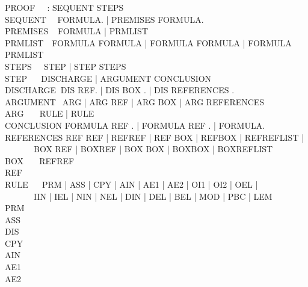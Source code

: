\documentclass[BA.tex]{subfiles}
\begin{document}
\newcommand{\id}{{\bf id}}
{\ttfamily
\noindent
PROOF $~~~~~$\tra \id: SEQUENT STEPS\\
SEQUENT $~~~$\tra {} FORMULA. | 
                   PREMISES FORMULA.\\
PREMISES $~~$\tra {} FORMULA
                |  PRMLIST\\
PRMLIST $~~~$\tra FORMULA  FORMULA
                | FORMULA FORMULA 
                | FORMULA\txt{, } PRMLIST\\
STEPS $~~~~~$\tra STEP | STEP STEPS\\
STEP $~~~~~~$\tra DISCHARGE | ARGUMENT CONCLUSION\\
DISCHARGE $~$\tra DIS REF. | DIS BOX . | DIS REFERENCES .\\
ARGUMENT $~~$\tra ARG | ARG REF | ARG BOX | ARG REFERENCES\\
ARG $~~~~~~~$\tra RULE  | RULE\\
CONCLUSION   \tra FORMULA REF . |  FORMULA REF . 
                |  FORMULA.\\
REFERENCES   \tra REF REF | REFREF |
                  REF BOX | REFBOX |
                  REF\txt{, }REFLIST |\\
$~~~~~~~~~~~~~~$  BOX REF | BOXREF |
                  BOX BOX | BOXBOX |
                  BOX\txt{, }REFLIST\\
BOX $~~~~~~~$\tra REF\txt{-}REF\\
REF $~~~~~~~$\tra [\id]\\
RULE $~~~~~~$\tra PRM | ASS | CPY | AIN | AE1 | AE2 | OI1 | OI2 | OEL |\\
$~~~~~~~~~~~~~~$  IIN | IEL | NIN | NEL | DIN | DEL | BEL | MOD | PBC | LEM\\
PRM $~~~~~~~$\tra{}\\
ASS $~~~~~~~$\tra{}\\
DIS $~~~~~~~$\tra{}\\
CPY $~~~~~~~$\tra{}\\
AIN $~~~~~~~$\tra{}\\
AE1 $~~~~~~~$\tra{}\\
AE2 $~~~~~~~$\tra{}\\
}
\end{document}
